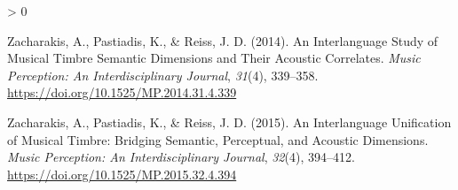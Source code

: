\documentclass[
  english,
  man,floatsintext]{apa6}
\newlength{\cslhangindent}
\newenvironment{CSLReferences}[2] %
 {%
  \setlength{\parindent}{0pt}
  \ifodd #1 \everypar{\setlength{\hangindent}{\cslhangindent}}\ignorespaces\fi
  \ifnum #2 > 0
  \setlength{\parskip}{#2\baselineskip}
  \fi
 }%
 {}
\begin{document}
\begin{CSLReferences}{1}{0}
\leavevmode\hypertarget{ref-Zacharakis2014}{}%
Zacharakis, A., Pastiadis, K., \& Reiss, J. D. (2014). {An Interlanguage Study of Musical Timbre Semantic Dimensions and Their Acoustic Correlates}. \emph{Music Perception: An Interdisciplinary Journal}, \emph{31}(4), 339--358. \url{https://doi.org/10.1525/MP.2014.31.4.339}

\leavevmode\hypertarget{ref-Zacharakis2015}{}%
Zacharakis, A., Pastiadis, K., \& Reiss, J. D. (2015). {An Interlanguage Unification of Musical Timbre: Bridging Semantic, Perceptual, and Acoustic Dimensions}. \emph{Music Perception: An Interdisciplinary Journal}, \emph{32}(4), 394--412. \url{https://doi.org/10.1525/MP.2015.32.4.394}

\end{CSLReferences}

\endgroup
\end{document}
